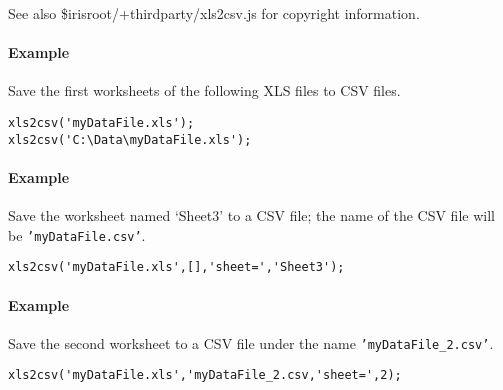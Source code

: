 See also \$irisroot/+thirdparty/xls2csv.js for copyright information.

\paragraph{Example}

Save the first worksheets of the following XLS files to CSV files.

\begin{verbatim}
xls2csv('myDataFile.xls');
xls2csv('C:\Data\myDataFile.xls');
\end{verbatim}

\paragraph{Example}

Save the worksheet named `Sheet3' to a CSV file; the name of the CSV
file will be \texttt{'myDataFile.csv'}.

\begin{verbatim}
xls2csv('myDataFile.xls',[],'sheet=','Sheet3');
\end{verbatim}

\paragraph{Example}

Save the second worksheet to a CSV file under the name
\texttt{'myDataFile\_2.csv'}.

\begin{verbatim}
xls2csv('myDataFile.xls','myDataFile_2.csv,'sheet=',2);
\end{verbatim}


